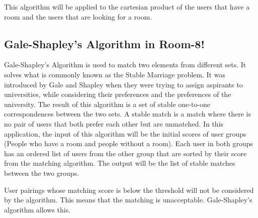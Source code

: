 \documentclass[journal]{./IEEE/IEEEtran}
\begin{document}
This algorithm will be applied to the cartesian product of the users that have a room and the users that are looking for a room.

\subsection{Gale-Shapley's Algorithm in Room-8!}
Gale-Shapley's Algorithm is used to match two elements from different sets. It solves what is commonly known as the Stable Marriage problem. It was introduced by Gale and Shapley when they were trying to assign aspirants to universities, while considering their preferences and the preferences of the university\cite{irving}. The result of this algorithm is a set of stable one-to-one correspondences between the two sets. A stable match is a match where there is no pair of users that both prefer each other but are unmatched\cite{marriage}. In this application, the input of this algorithm will be the initial scores of user groups (People who have a room and people without a room). Each user in both groups has an ordered list of users from the other group that are sorted by their score from the matching algorithm. The output will be the list of stable matches between the two groups.

User pairings whose matching score is below the threshold will not be considered by the algorithm. This means that the matching is unacceptable. Gale-Shapley's algorithm allows this\cite{marriage}.







\newpage
\end{document}
